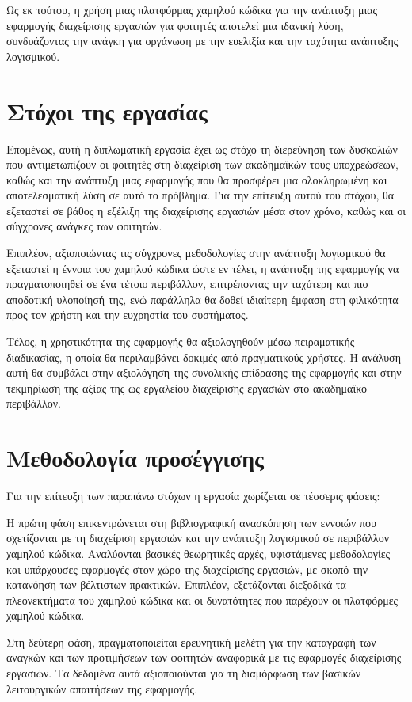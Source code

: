 		Ως εκ τούτου, η χρήση μιας πλατφόρμας χαμηλού κώδικα για την ανάπτυξη μιας εφαρμογής διαχείρισης εργασιών για φοιτητές αποτελεί μια ιδανική λύση, συνδυάζοντας την ανάγκη για οργάνωση με την ευελιξία και την ταχύτητα ανάπτυξης λογισμικού.


	\section{Στόχοι της εργασίας}
		Επομένως, αυτή η διπλωματική εργασία έχει ως στόχο τη διερεύνηση των δυσκολιών που αντιμετωπίζουν οι φοιτητές στη διαχείριση των ακαδημαϊκών τους υποχρεώσεων, καθώς και την ανάπτυξη μιας εφαρμογής που θα προσφέρει μια ολοκληρωμένη και αποτελεσματική λύση σε αυτό το πρόβλημα. Για την επίτευξη αυτού του στόχου, θα εξεταστεί σε βάθος η εξέλιξη της διαχείρισης εργασιών μέσα στον χρόνο, καθώς και οι σύγχρονες ανάγκες των φοιτητών.

		Επιπλέον, αξιοποιώντας τις σύγχρονες μεθοδολογίες στην ανάπτυξη λογισμικού θα εξεταστεί η έννοια του χαμηλού κώδικα ώστε εν τέλει, η ανάπτυξη της εφαρμογής να πραγματοποιηθεί σε ένα τέτοιο περιβάλλον, επιτρέποντας την ταχύτερη και πιο αποδοτική υλοποίησή της, ενώ παράλληλα θα δοθεί ιδιαίτερη έμφαση στη φιλικότητα προς τον χρήστη και την ευχρηστία του συστήματος.

		Τέλος, η χρηστικότητα της εφαρμογής θα αξιολογηθούν μέσω πειραματικής διαδικασίας, η οποία θα περιλαμβάνει δοκιμές από πραγματικούς χρήστες. Η ανάλυση αυτή θα συμβάλει στην αξιολόγηση της συνολικής επίδρασης της εφαρμογής και στην τεκμηρίωση της αξίας της ως εργαλείου διαχείρισης εργασιών στο ακαδημαϊκό περιβάλλον.


	\section{Μεθοδολογία προσέγγισης}
		Για την επίτευξη των παραπάνω στόχων η εργασία χωρίζεται σε τέσσερις φάσεις:

		Η πρώτη φάση επικεντρώνεται στη βιβλιογραφική ανασκόπηση των εννοιών που σχετίζονται με τη διαχείριση εργασιών και την ανάπτυξη λογισμικού σε περιβάλλον χαμηλού κώδικα. Αναλύονται βασικές θεωρητικές αρχές, υφιστάμενες μεθοδολογίες και υπάρχουσες εφαρμογές στον χώρο της διαχείρισης εργασιών, με σκοπό την κατανόηση των βέλτιστων πρακτικών. Επιπλέον, εξετάζονται διεξοδικά τα πλεονεκτήματα του χαμηλού κώδικα και οι δυνατότητες που παρέχουν οι πλατφόρμες χαμηλού κώδικα.

		Στη δεύτερη φάση, πραγματοποιείται ερευνητική μελέτη για την καταγραφή των αναγκών και των προτιμήσεων των φοιτητών αναφορικά με τις εφαρμογές διαχείρισης εργασιών. Τα δεδομένα αυτά αξιοποιούνται για τη διαμόρφωση των βασικών λειτουργικών απαιτήσεων της εφαρμογής.

